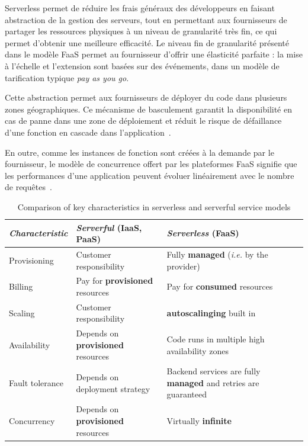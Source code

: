 Serverless permet de réduire les frais généraux des développeurs en faisant abstraction de la gestion des serveurs, tout en permettant aux fournisseurs de partager les ressources physiques à un niveau de granularité très fin, ce qui permet d'obtenir une meilleure efficacité. Le niveau fin de granularité présenté dans le modèle FaaS permet au fournisseur d'offrir une élasticité parfaite : la mise à l'échelle et l'extension sont basées sur des événements, dans un modèle de tarification typique \textit{pay as you go}.

Cette abstraction permet aux fournisseurs de déployer du code dans plusieurs zones géographiques. Ce mécanisme de basculement garantit la disponibilité en cas de panne dans une zone de déploiement et réduit le risque de défaillance d'une fonction en cascade dans l'application~\cite{taibiPatternsServerlessFunctions2020}.

En outre, comme les instances de fonction sont créées à la demande par le fournisseur, le modèle de concurrence offert par les plateformes FaaS signifie que les performances d'une application peuvent évoluer linéairement avec le nombre de requêtes~\cite{mcgrathServerlessComputingDesign2017}.

\begin{table}[H]
    \caption{Comparison of key characteristics in serverless and serverful service models}
    \centering
    \begin{tabularx}{\textwidth} { 
      | >{\centering\arraybackslash}X 
      | >{\centering\arraybackslash}X 
      | >{\centering\arraybackslash}X  | }
         \hline
        \textit{Characteristic}  & \textit{Serverful} (IaaS, PaaS)           & \textit{Serverless} (FaaS)                                             \\ \hline
        Provisioning    & Customer responsibility          & Fully \textbf{managed} (\textit{i.e.} by the provider)    \\ \hline
        Billing         & Pay for \textbf{provisioned} resources    & Pay for \textbf{consumed} resources                                    \\ \hline
        Scaling         & Customer responsibility          & \textbf{autoscalinging} built in                                         \\ \hline
        Availability    & Depends on \textbf{provisioned} resources & Code runs in multiple high availability zones                 \\ \hline
        Fault tolerance & Depends on deployment strategy   & Backend services are fully \textbf{managed} and retries are guaranteed \\ \hline
        Concurrency     & Depends on \textbf{provisioned} resources & Virtually \textbf{infinite} \\
        \hline
    \end{tabularx}
    \label{table:serverful-serverless}
\end{table}

